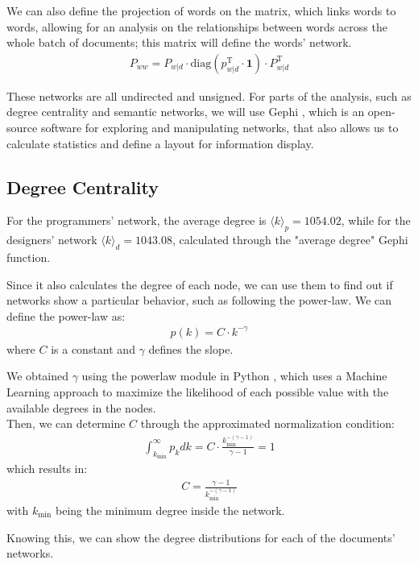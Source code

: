 \documentclass[conference]{IEEEtran}
\begin{document}
We can also define the projection of words on the matrix, which links words to words, allowing for an analysis on the relationships between words across the whole batch of documents; this matrix will define the words' network.
\begin{align*}
    P_{ww} = P_{w \vert d} \cdot \text{diag}(p_{w\vert d}^\text{T} \cdot \mathbf{1}) \cdot P_{w \vert d}^\text{T}
\end{align*}

These networks are all undirected and unsigned. For parts of the analysis, such as degree centrality and semantic networks, we will use Gephi \cite{b16}, which is an open-source software for exploring and manipulating networks, that also allows us to calculate statistics and define a layout for information display. 

\subsection{Degree Centrality}

For the programmers' network, the average degree is $\langle k \rangle_p = 1054.02$, while for the designers' network $\langle k \rangle_d = 1043.08$, calculated through the "average degree" Gephi function.

Since it also calculates the degree of each node, we can use them to find out if networks show a particular behavior, such as following the power-law. We can define the power-law as:
\begin{align*}
    p(k) = C \cdot k^{-\gamma}
\end{align*}
where $C$ is a constant and $\gamma$ defines the slope.

We obtained $\gamma$ using the powerlaw module in Python \cite{b17}, which uses a Machine Learning approach to maximize the likelihood of each possible value with the available degrees in the nodes.\\
Then, we can determine $C$ through the approximated normalization condition: 
\begin{align*}
    \int_{k_{\min}}^\infty p_k dk = C \cdot \frac{k_{\min}^{-(\gamma - 1)}}{\gamma - 1} = 1
\end{align*}
which results in:
\begin{align*}
    C = \frac{\gamma - 1}{k_{\min}^{-(\gamma - 1)}}
\end{align*}
with $k_{\min}$ being the minimum degree inside the network. 

Knowing this, we can show the degree distributions for each of the documents' networks.
\end{document}
